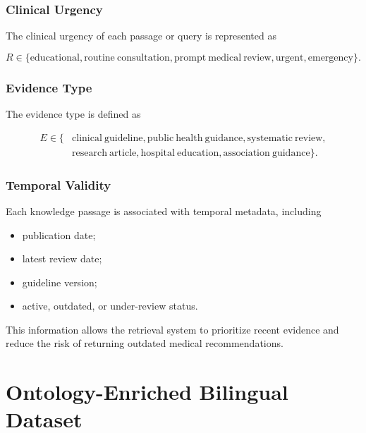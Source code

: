 \documentclass{article}
\begin{document}
\subsubsection{Clinical Urgency}

The clinical urgency of each passage or query is represented as

\begin{equation}
    R \in
    \{
    \mathrm{educational},
    \mathrm{routine\ consultation},
    \mathrm{prompt\ medical\ review},
    \mathrm{urgent},
    \mathrm{emergency}
    \}.
\end{equation}

\subsubsection{Evidence Type}

The evidence type is defined as

\begin{equation}
\begin{split}
    E \in \{&
    \mathrm{clinical\ guideline},
    \mathrm{public\ health\ guidance},
    \mathrm{systematic\ review},\\
    &\mathrm{research\ article},
    \mathrm{hospital\ education},
    \mathrm{association\ guidance}
    \}.
\end{split}
\end{equation}

\subsubsection{Temporal Validity}

Each knowledge passage is associated with temporal metadata, including

\begin{itemize}
    \item publication date;
    \item latest review date;
    \item guideline version;
    \item active, outdated, or under-review status.
\end{itemize}

This information allows the retrieval system to prioritize recent evidence 
and reduce the risk of returning outdated medical recommendations.

\section{Ontology-Enriched Bilingual Dataset}
\end{document}
